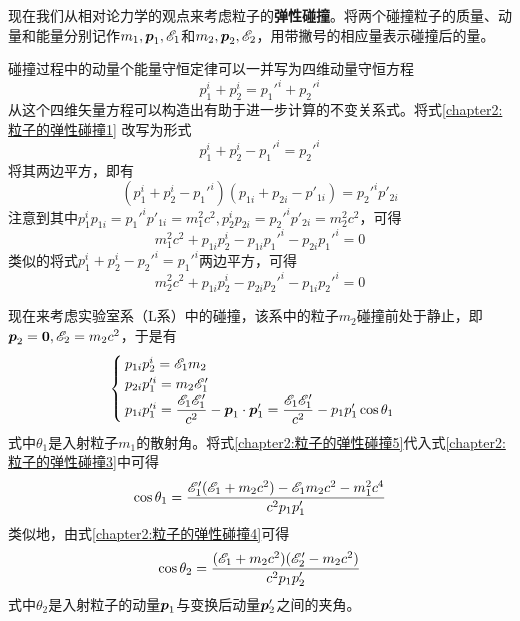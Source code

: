 现在我们从相对论力学的观点来考虑粒子的{\bf 弹性碰撞}。将两个碰撞粒子的质量、动量和能量分别记作$m_1, \boldsymbol{p}_1, \mathscr{E}_1$和$m_2, \boldsymbol{p}_2, \mathscr{E}_2$，用带撇号的相应量表示碰撞后的量。

碰撞过程中的动量个能量守恒定律可以一并写为四维动量守恒方程
\begin{equation}
	p_1^i + p_2^i = p_1'^i + p_2'^i
	\label{chapter2:粒子的弹性碰撞1}
\end{equation}
从这个四维矢量方程可以构造出有助于进一步计算的不变关系式。将式\eqref{chapter2:粒子的弹性碰撞1}
改写为形式
\begin{equation}
	p_1^i+p_2^i - p_1'^i = p_2'^i
	\label{chapter2:粒子的弹性碰撞2}
\end{equation}
将其两边平方，即有
\begin{equation*}
	(p_1^i+p_2^i - p_1'^i)(p_{1i}+p_{2i} - p'_{1i}) = p_2'^ip'_{2i}
\end{equation*}
注意到其中$p_1^ip_{1i} = p_1'^ip'_{1i} = m_1^2c^2, p_2^ip_{2i} = p_2'^ip'_{2i} = m_2^2c^2$，可得
\begin{equation}
	m_1^2c^2 + p_{1i}p_2^i - p_{1i}p_1'^i - p_{2i}p_1'^i = 0
	\label{chapter2:粒子的弹性碰撞3}
\end{equation}
类似的将式$p_1^i+p_2^i - p_2'^i = p_1'^i$两边平方，可得
\begin{equation}
	m_2^2c^2 + p_{1i}p_2^i - p_{2i}p_2'^i - p_{1i}p_2'^i = 0
	\label{chapter2:粒子的弹性碰撞4}
\end{equation}

现在来考虑实验室系（L系）中的碰撞，该系中的粒子$m_2$碰撞前处于静止，即$\boldsymbol{p}_2=\boldsymbol{0}, \mathscr{E}_2 = m_2c^2$，于是有
\begin{equation}
\begin{cases}
	p_{1i}p_2^i = \mathscr{E}_1m_2 \\
	p_{2i}p_1'^i = m_2\mathscr{E}'_1 \\
	p_{1i}p_1'^i = \dfrac{\mathscr{E}_1\mathscr{E}'_1}{c^2} - \boldsymbol{p}_1 \cdot \boldsymbol{p}'_1 = \dfrac{\mathscr{E}_1\mathscr{E}'_1}{c^2} - p_1p'_1\cos \theta_1
\end{cases}
\label{chapter2:粒子的弹性碰撞5}
\end{equation}
式中$\theta_1$是入射粒子$m_1$的散射角。将式\eqref{chapter2:粒子的弹性碰撞5}代入式\eqref{chapter2:粒子的弹性碰撞3}中可得
\begin{equation}
	\cos \theta_1 = \frac{\mathscr{E}'_1(\mathscr{E}_1+m_2c^2) - \mathscr{E}_1m_2c^2-m_1^2c^4}{c^2p_1p'_1}
	\label{chapter2:粒子弹性碰撞后粒子1的散射角}
\end{equation}
类似地，由式\eqref{chapter2:粒子的弹性碰撞4}可得
\begin{equation}
	\cos \theta_2 = \frac{(\mathscr{E}_1+m_2c^2)(\mathscr{E}'_2-m_2c^2)}{c^2p_1p'_2}
	\label{chapter2:粒子弹性碰撞后粒子2的散射角}
\end{equation}
式中$\theta_2$是入射粒子的动量$\boldsymbol{p}_1$与变换后动量$\boldsymbol{p}'_2$之间的夹角。


